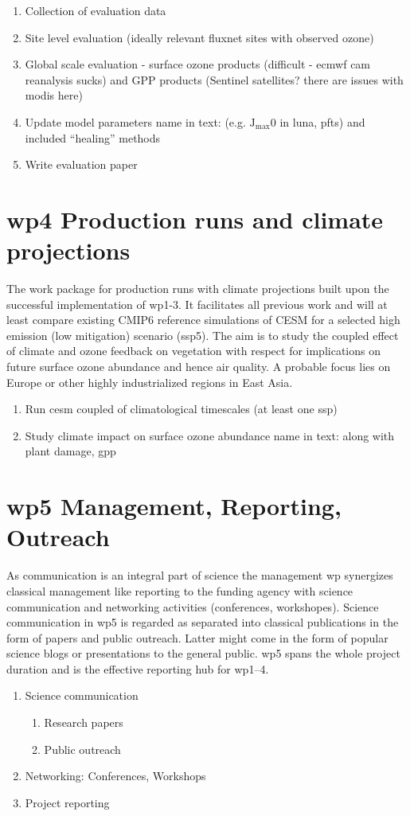 \begin{enumerate}[start=1,label={T3.\arabic*:}]
  \itemsep0pt
\item Collection of evaluation data 
\item Site level evaluation (ideally relevant fluxnet sites with observed ozone)
\item Global scale evaluation - surface ozone products (difficult - \gls{ecmwf} \gls{cam} reanalysis sucks) and GPP products (Sentinel satellites? there are issues with \gls{modis} here)
\item Update model parameters 
name in text: (e.g. $\mathrm{J_{max}}$0 in \gls{luna}, \glspl{pft}) and included “healing” methods
\item Write evaluation paper
\end{enumerate}

\section*{\gls{wp}4 Production runs and climate projections}
\label{ssec:wp4}
The work package for production runs with climate projections built upon the successful implementation of \gls{wp}1-3. It facilitates all previous work and will at least compare existing CMIP6 reference simulations of CESM for a selected high emission (low mitigation) scenario (\gls{ssp}5). The aim is to study the coupled effect of climate and ozone feedback on vegetation with respect for implications on future surface ozone abundance and hence air quality. A probable focus lies on Europe or other highly industrialized regions in East Asia.

\begin{enumerate}[start=1,label={T4.\arabic*:}]
  \itemsep0pt
\item Run \gls{cesm} coupled of climatological timescales (at least one \gls{ssp})
\item Study climate impact on surface ozone abundance 
name in text: along with plant damage, gpp
\end{enumerate}

\section*{\gls{wp}5 Management, Reporting, Outreach}
\label{ssec:wp5}
As communication is an integral part of science the management \gls{wp} synergizes classical management like reporting to the funding agency with science communication and networking activities (conferences, workshopes). Science communication in \gls{wp}5 is regarded as separated into classical publications in the form of papers and public outreach. Latter might come in the form of popular science blogs or presentations to the general public. \gls{wp}5 spans the whole project duration and is the effective reporting hub for \gls{wp}1--4.

\begin{enumerate}[start=1,label={T5.\arabic*:}]
  \itemsep0pt
\item Science communication
  \begin{enumerate}
    \itemsep0pt
  \item Research papers
  \item Public outreach
  \end{enumerate}
\item Networking: Conferences, Workshops
\item Project reporting
\end{enumerate}
